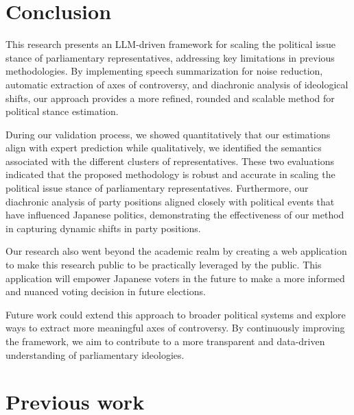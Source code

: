 \documentclass[final,5p,times,twocolumn,authoryear]{elsarticle}
\begin{document}
\section{Conclusion}
This research presents an LLM-driven framework for scaling the political issue stance of parliamentary representatives, addressing key limitations in previous methodologies. By implementing speech summarization for noise reduction, automatic extraction of axes of controversy, and diachronic analysis of ideological shifts, our approach provides a more refined, rounded and scalable method for political stance estimation. 

During our validation process, we showed quantitatively that our estimations align with expert prediction while qualitatively, we identified the semantics associated with the different clusters of representatives. These two evaluations indicated that the proposed methodology is robust and accurate in scaling the political issue stance of parliamentary representatives. Furthermore, our diachronic analysis of party positions aligned closely with political events that have influenced Japanese politics, demonstrating the effectiveness of our method in capturing dynamic shifts in party positions.

Our research also went beyond the academic realm by creating a web application to make this research public to be practically leveraged by the public. This application will empower Japanese voters in the future to make a more informed and nuanced voting decision in future elections.

Future work could extend this approach to broader political systems and explore ways to extract more meaningful axes of controversy. By continuously improving the framework, we aim to contribute to a more transparent and data-driven understanding of parliamentary ideologies.


\FloatBarrier
\newpage
\appendix
\section{Previous work}
\end{document}

